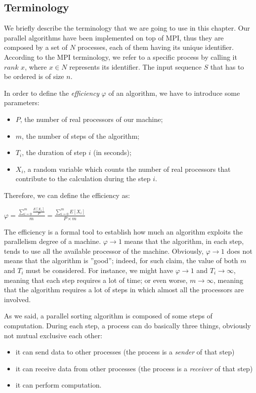 \subsection*{Terminology}
We briefly describe the terminology that we are going to use in this chapter. Our parallel algorithms have been implemented on top of MPI, thus they are composed by a set of $N$ processes, each of them having its unique identifier. According to the MPI terminology, we refer to a specific process by calling it $rank$ $x$, where $x \in N$ represents its identifier. The input sequence $S$ that has to be ordered is of size $n$. 

In order to define the \textit{efficiency} $\varphi$ of an algorithm, we have to introduce some parameters:
\begin{itemize}
\item $P$, the number of real processors of our machine; 
\item $m$, the number of steps of the algorithm;
\item $T_i$, the duration of step $i$ (in seconds);
\item $X_i$, a random variable which counts the number of real processors that contribute to the calculation during the step $i$.
\end{itemize}
Therefore, we can define the efficiency as:
\begin{center}
$\varphi = \frac{\sum_{i=0}^m \frac{E[X_i]}{P}}{m} = \frac{\sum_{i=0}^m E[X_i]}{P \times m} $
\end{center}
The efficiency is a formal tool to establish how much an algorithm exploits the parallelism degree of a machine. $\varphi \rightarrow 1$ means that the algorithm, in each step, tends to use all the available processor of the machine. Obviously, $\varphi \rightarrow 1$ does not means that the algorithm is ''good''; indeed, for such claim, the value of both $m$ and $T_i$ must be considered. For instance, we might have $\varphi \rightarrow 1$ and $T_i \rightarrow\infty$, meaning that each step requires a lot of time; or even worse, $m \rightarrow\infty$, meaning that the algorithm requires a lot of steps in which almost all the processors are involved.

As we said, a parallel sorting algorithm is composed of some steps of computation. During each step, a process can do basically three things, obviously not mutual exclusive each other:
\begin{itemize}
\item it can send data to other processes (the process is a \textit{sender} of that step)
\item it can receive data from other processes (the process is a \textit{receiver} of that step)
\item it can perform computation.
\end{itemize}
